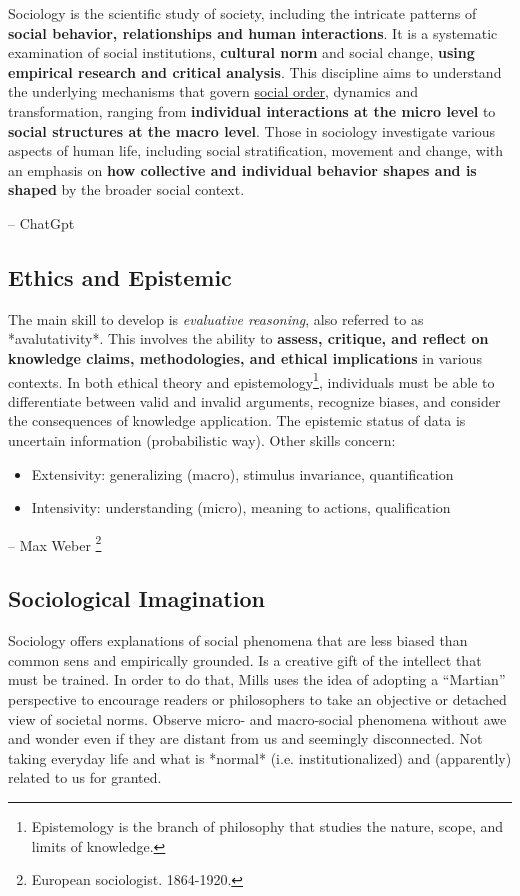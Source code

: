 \begin{displayquote}
    Sociology is the scientific study of society, including the intricate patterns of \textbf{social behavior, relationships and human interactions}. It is a systematic examination of social institutions, \textbf{cultural norm} and social change, \textbf{using empirical research and critical analysis}. This discipline aims to understand the underlying mechanisms that govern \underline{social order}, dynamics and transformation, ranging from \textbf{individual interactions at the micro level} to \textbf{social structures at the macro level}. 
    Those in sociology investigate various aspects of human life, including social stratification, movement and change, with an emphasis on \textbf{how collective and individual behavior shapes and is shaped} by the broader social context.
\end{displayquote}
\hfill -- ChatGpt

\subsection{Ethics and Epistemic}

The main skill to develop is \textit{evaluative reasoning}, also referred to as *avalutativity*. This involves the ability to \textbf{assess, critique, and reflect on knowledge claims, methodologies, and ethical implications} in various contexts. In both ethical theory and epistemology\footnote{Epistemology is the branch of philosophy that studies the nature, scope, and limits of knowledge. }, individuals must be able to differentiate between valid and invalid arguments, recognize biases, and consider the consequences of knowledge application. The epistemic status of data is uncertain information (probabilistic way).
Other skills concern:
\begin{itemize}
    \item Extensivity: generalizing (macro), stimulus invariance, quantification
    \item Intensivity: understanding (micro), meaning to actions, qualification
\end{itemize}

\hfill -- Max Weber \footnote{European sociologist. 1864-1920.}

\subsection{Sociological Imagination}

Sociology offers explanations of social phenomena that are less biased than common sens and empirically grounded. Is a creative gift of the intellect that must be trained. In order to do that, Mills uses the idea of adopting a “Martian” perspective to encourage readers or philosophers to take an objective or detached view of societal norms. Observe micro- and macro-social phenomena without awe and wonder even if they are distant from us and seemingly disconnected. Not taking everyday life and what is *normal* (i.e. institutionalized) and (apparently) related to us for granted.

